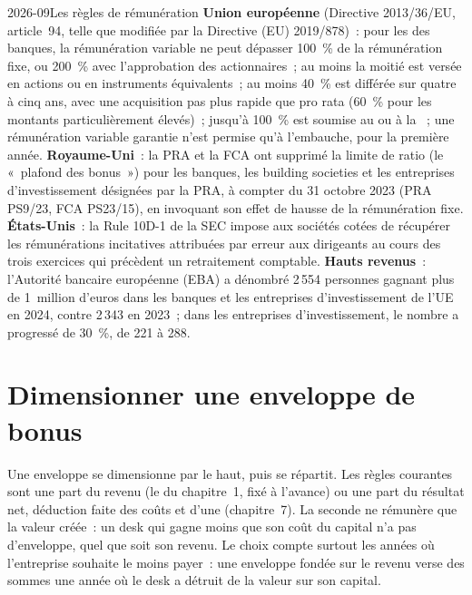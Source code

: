 \begin{dated}{2026-09}{Les règles de rémunération}\label{dat:fm:hiring-and-compensation:rules}
\textbf{Union européenne} (Directive 2013/36/EU, article~94, telle que modifiée par la Directive (EU) 2019/878)~: pour les  des banques, la rémunération variable
ne peut dépasser 100~\% de la rémunération fixe, ou 200~\% avec l'approbation des actionnaires~; au moins la moitié est versée en actions ou en instruments équivalents~; au moins 40~\%
est différée sur quatre à cinq ans, avec une acquisition pas plus rapide que pro rata (60~\% pour les montants particulièrement élevés)~; jusqu'à 100~\% est soumise au  ou
à la ~; une rémunération variable garantie n'est permise qu'à l'embauche, pour la première année. \textbf{Royaume-Uni}~: la PRA et la FCA ont supprimé la
limite de ratio (le «~plafond des bonus~») pour les banques, les building societies et les entreprises d'investissement désignées par la PRA, à compter du 31 octobre 2023 (PRA PS9/23, FCA PS23/15), en invoquant
son effet de hausse de la rémunération fixe. \textbf{États-Unis}~: la Rule 10D-1 de la SEC impose aux sociétés cotées de récupérer les rémunérations incitatives attribuées par erreur aux
dirigeants au cours des trois exercices qui précèdent un retraitement comptable. \textbf{Hauts revenus}~: l'Autorité bancaire européenne (EBA) a dénombré 2\,554
personnes gagnant plus de 1~million d'euros dans les banques et les entreprises d'investissement de l'UE en 2024, contre 2\,343 en 2023~; dans les entreprises d'investissement, le nombre a progressé de 30~\%,
de 221 à 288.
\end{dated}

\section{Dimensionner une enveloppe de bonus}

Une enveloppe se dimensionne par le haut, puis se répartit. Les règles courantes sont une part du revenu (le  du chapitre~1, fixé à l'avance) ou une
part du résultat net, déduction faite des coûts et d'une  (chapitre~7). La seconde ne rémunère que la valeur créée~: un desk qui gagne moins que son
coût du capital n'a pas d'enveloppe, quel que soit son revenu. Le choix compte surtout les années où l'entreprise souhaite le moins payer~: une enveloppe fondée sur le revenu verse
des sommes une année où le desk a détruit de la valeur sur son capital.

